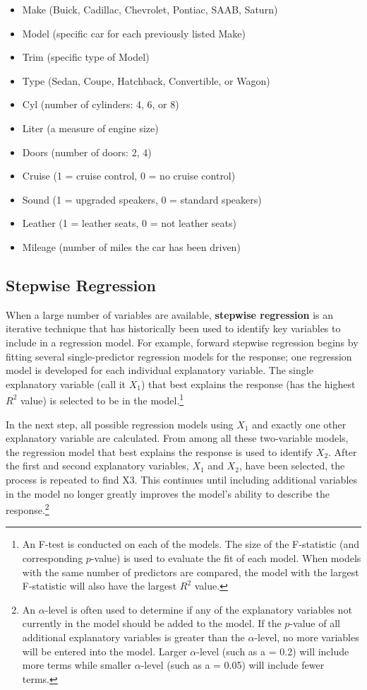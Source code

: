\documentclass[
]{report}
\providecommand{\tightlist}{%
  \setlength{\itemsep}{0pt}\setlength{\parskip}{0pt}}
\theoremstyle{definition}
\theoremstyle{definition}
\theoremstyle{definition}
\theoremstyle{definition}
\theoremstyle{remark}
\begin{document}
\begin{itemize}
\tightlist
\item
  Make (Buick, Cadillac, Chevrolet, Pontiac, SAAB, Saturn)
\item
  Model (specific car for each previously listed Make)
\item
  Trim (specific type of Model)
\item
  Type (Sedan, Coupe, Hatchback, Convertible, or Wagon)
\item
  Cyl (number of cylinders: 4, 6, or 8)
\item
  Liter (a measure of engine size)
\item
  Doors (number of doors: 2, 4)
\item
  Cruise (1 = cruise control, 0 = no cruise control)
\item
  Sound (1 = upgraded speakers, 0 = standard speakers)
\item
  Leather (1 = leather seats, 0 = not leather seats)
\item
  Mileage (number of miles the car has been driven)
\end{itemize}

\hypertarget{stepwise-regression}{%
\subsection{Stepwise Regression}\label{stepwise-regression}}

When a large number of variables are available, \textbf{stepwise regression} is an iterative technique that has historically been used to identify key variables to include in a regression model. For example, forward stepwise regression begins by fitting several single-predictor regression models for the response; one regression model is developed for each individual explanatory variable. The single explanatory variable (call it \(X_1\)) that best explains the response (has the highest \(R^2\) value) is selected to be in the model.\footnote{An F-test is conducted on each of the models. The size of the F-statistic (and corresponding \(p\)-value) is used to evaluate the fit of each model. When models with the same number of predictors are compared, the model with the largest F-statistic will also have the largest \(R^2\) value.}

In the next step, all possible regression models using \(X_1\) and exactly one other explanatory variable are calculated. From among all these two-variable models, the regression model that best explains the response is used to identify \(X_2\). After the first and second explanatory variables, \(X_1\) and \(X_2\), have been selected, the process is repeated to find X3. This continues until including additional variables in the model no longer
greatly improves the model's ability to describe the response.\footnote{An \(\alpha\)-level is often used to determine if any of the explanatory variables not currently in the model should be added to the model. If the \(p\)-value of all additional explanatory variables is greater than the \(\alpha\)-level, no more variables will be entered into the model. Larger \(\alpha\)-level (such as a = 0.2) will include more terms while smaller \(\alpha\)-level (such as a = 0.05) will include fewer terms.}
\end{document}
